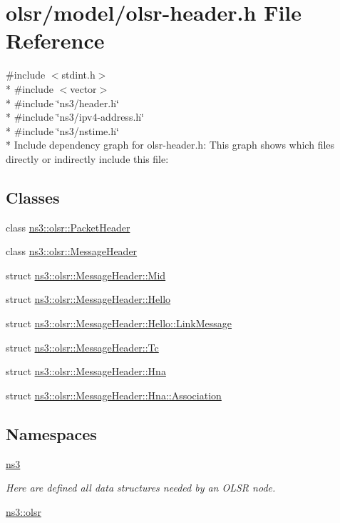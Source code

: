 \hypertarget{olsr-header_8h}{}\section{olsr/model/olsr-\/header.h File Reference}
\label{olsr-header_8h}
{\ttfamily \#include $<$stdint.\+h$>$}\\*
{\ttfamily \#include $<$vector$>$}\\*
{\ttfamily \#include \char`\"{}ns3/header.\+h\char`\"{}}\\*
{\ttfamily \#include \char`\"{}ns3/ipv4-\/address.\+h\char`\"{}}\\*
{\ttfamily \#include \char`\"{}ns3/nstime.\+h\char`\"{}}\\*
Include dependency graph for olsr-\/header.h\+:
This graph shows which files directly or indirectly include this file\+:
\subsection*{Classes}
\begin{DoxyCompactItemize}
\item 
class \hyperlink{classns3_1_1olsr_1_1PacketHeader}{ns3\+::olsr\+::\+Packet\+Header}
\item 
class \hyperlink{classns3_1_1olsr_1_1MessageHeader}{ns3\+::olsr\+::\+Message\+Header}
\item 
struct \hyperlink{structns3_1_1olsr_1_1MessageHeader_1_1Mid}{ns3\+::olsr\+::\+Message\+Header\+::\+Mid}
\item 
struct \hyperlink{structns3_1_1olsr_1_1MessageHeader_1_1Hello}{ns3\+::olsr\+::\+Message\+Header\+::\+Hello}
\item 
struct \hyperlink{structns3_1_1olsr_1_1MessageHeader_1_1Hello_1_1LinkMessage}{ns3\+::olsr\+::\+Message\+Header\+::\+Hello\+::\+Link\+Message}
\item 
struct \hyperlink{structns3_1_1olsr_1_1MessageHeader_1_1Tc}{ns3\+::olsr\+::\+Message\+Header\+::\+Tc}
\item 
struct \hyperlink{structns3_1_1olsr_1_1MessageHeader_1_1Hna}{ns3\+::olsr\+::\+Message\+Header\+::\+Hna}
\item 
struct \hyperlink{structns3_1_1olsr_1_1MessageHeader_1_1Hna_1_1Association}{ns3\+::olsr\+::\+Message\+Header\+::\+Hna\+::\+Association}
\end{DoxyCompactItemize}
\subsection*{Namespaces}
\begin{DoxyCompactItemize}
\item 
 \hyperlink{namespacens3}{ns3}
\begin{DoxyCompactList}\small\item\em Here are defined all data structures needed by an O\+L\+SR node. \end{DoxyCompactList}\item 
 \hyperlink{namespacens3_1_1olsr}{ns3\+::olsr}
\end{DoxyCompactItemize}
